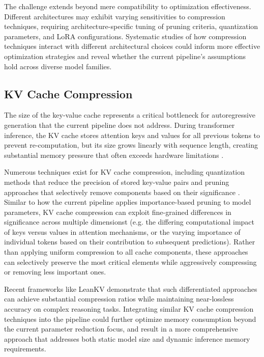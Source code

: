 The challenge extends beyond mere compatibility to optimization effectiveness. Different architectures may exhibit varying sensitivities to compression techniques, requiring architecture-specific tuning of pruning criteria, quantization parameters, and LoRA configurations. Systematic studies of how compression techniques interact with different architectural choices could inform more effective optimization strategies and reveal whether the current pipeline's assumptions hold across diverse model families.

\subsection{KV Cache Compression}
The size of the key-value cache represents a critical bottleneck for autoregressive generation that the current pipeline does not address. During transformer inference, the KV cache stores attention keys and values for all previous tokens to prevent re-computation, but its size grows linearly with sequence length, creating substantial memory pressure that often exceeds hardware limitations \cite{kvcompr}.

Numerous techniques exist for KV cache compression, including quantization methods that reduce the precision of stored key-value pairs and pruning approaches that selectively remove components based on their significance \cite{kvcompr2}. Similar to how the current pipeline applies importance-based pruning to model parameters, KV cache compression can exploit fine-grained differences in significance across multiple dimensionst (e.g. the differing computational impact of keys versus values in attention mechanisms, or the varying importance of individual tokens based on their contribution to subsequent predictions). Rather than applying uniform compression to all cache components, these approaches can selectively preserve the most critical elements while aggressively compressing or removing less important ones.

Recent frameworks like LeanKV \cite{kvcompr2} demonstrate that such differentiated approaches can achieve substantial compression ratios while maintaining near-lossless accuracy on complex reasoning tasks. Integrating similar KV cache compression techniques into the pipeline could further optimize memory consumption beyond the current parameter reduction focus, and result in a more comprehensive approach that addresses both static model size and dynamic inference memory requirements.

